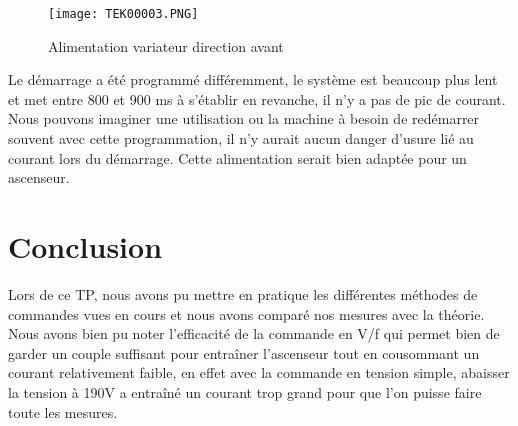 \documentclass[oneside,a4paper,12pt]{article}
\begin{document}
	\begin{figure}[h]
		\centering
		\texttt{[image: TEK00003.PNG]}
		\caption{Alimentation variateur direction avant}
	\end{figure}
	\newpage
	Le démarrage a été programmé différemment, le système est beaucoup plus lent et met entre 800 et 900 ms à s’établir en revanche, il n’y a pas de pic de courant. Nous pouvons imaginer une utilisation ou la machine à besoin de redémarrer souvent avec cette programmation, il n’y aurait aucun danger d’usure lié au courant lors du démarrage. Cette alimentation serait bien adaptée pour un ascenseur.\\
	
	\section{Conclusion}
	
	Lors de ce TP, nous avons pu mettre en pratique les différentes méthodes de commandes vues en cours et nous avons comparé nos mesures avec la théorie.\\
	
	Nous avons bien pu noter l'efficacité de la commande en V/f qui permet bien de garder un couple suffisant pour entraîner l'ascenseur tout en cousommant un courant relativement faible, en effet avec la commande en tension simple, abaisser la tension à 190V a entraîné un courant trop grand pour que l'on puisse faire toute les mesures.
		
\end{document}

